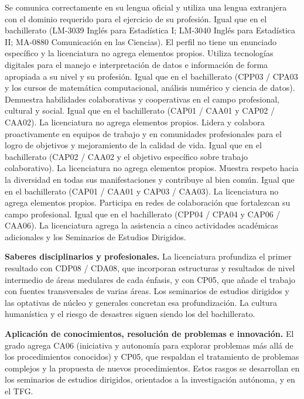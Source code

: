 \documentclass[11pt,a4paper]{article}
\begin{document}
{Se comunica correctamente en su lengua oficial y utiliza una lengua extranjera con el dominio requerido para el ejercicio de su profesión.}
{Igual que en el bachillerato (LM-3039 Inglés para Estadística I; LM-3040 Inglés para Estadística II; MA-0880 Comunicación en las Ciencias). El perfil no tiene un enunciado específico y la licenciatura no agrega elementos propios.}
{Utiliza tecnologías digitales para el manejo e interpretación de datos e información de forma apropiada a su nivel y su profesión.}
{Igual que en el bachillerato (CPP03 / CPA03 y los cursos de matemática computacional, análisis numérico y ciencia de datos).}
{Demuestra habilidades colaborativas y cooperativas en el campo profesional, cultural y social.}
{Igual que en el bachillerato (CAP01 / CAA01 y CAP02 / CAA02). La licenciatura no agrega elementos propios.}
{Lidera y colabora proactivamente en equipos de trabajo y en comunidades profesionales para el logro de objetivos y mejoramiento de la calidad de vida.}
{Igual que en el bachillerato (CAP02 / CAA02 y el objetivo específico sobre trabajo colaborativo). La licenciatura no agrega elementos propios.}
{Muestra respeto hacia la diversidad en todas sus manifestaciones y contribuye al bien común.}
{Igual que en el bachillerato (CAP01 / CAA01 y CAP03 / CAA03). La licenciatura no agrega elementos propios.}
{Participa en redes de colaboración que fortalezcan su campo profesional.}
{Igual que en el bachillerato (CPP04 / CPA04 y CAP06 / CAA06). La licenciatura agrega la asistencia a cinco actividades académicas adicionales y los Seminarios de Estudios Dirigidos.}
\finmcesca

\textbf{Saberes disciplinarios y profesionales.} La licenciatura profundiza el primer resultado con CDP08 / CDA08, que incorporan estructuras y resultados de nivel intermedio de áreas medulares de cada énfasis, y con CP05, que añade el trabajo con fuentes transversales de varias áreas. Los seminarios de estudios dirigidos y las optativas de núcleo y generales concretan esa profundización. La cultura humanística y el riesgo de desastres siguen siendo los del bachillerato.

\textbf{Aplicación de conocimientos, resolución de problemas e innovación.} El grado agrega CA06 (iniciativa y autonomía para explorar problemas más allá de los procedimientos conocidos) y CP05, que respaldan el tratamiento de problemas complejos y la propuesta de nuevos procedimientos. Estos rasgos se desarrollan en los seminarios de estudios dirigidos, orientados a la investigación autónoma, y en el TFG.
\end{document}
